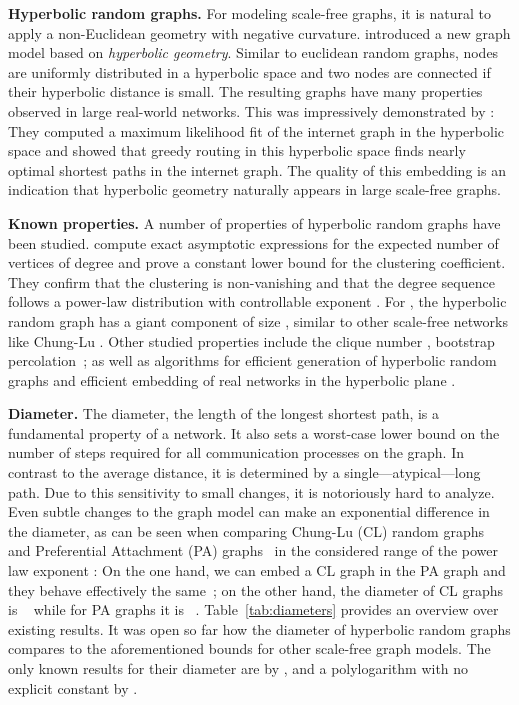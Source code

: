 \documentclass{llncs}
\newcommand{\tabref}[1]{Table~\ref{tab:#1}}
\begin{document}
\textbf{Hyperbolic random graphs.}
For modeling scale-free graphs, it is natural to apply a non-Euclidean geometry with negative curvature.
\citet{krioukov2010hyperbolic} introduced a new graph model based on \emph{hyperbolic geometry}. Similar to euclidean random graphs,
nodes are uniformly distributed in a hyperbolic space and two nodes are connected
if their hyperbolic distance is small. 
The resulting graphs have many properties observed in large real-world networks.
This was impressively demonstrated by \citet{boguna2010sustaining}:
They computed a maximum likelihood fit of the internet graph in the hyperbolic space
and showed that greedy routing in this hyperbolic space finds nearly optimal shortest paths in the internet graph.
The quality of this embedding is an indication that hyperbolic geometry naturally appears in large scale-free graphs.

\textbf{Known properties.}
A number of properties of hyperbolic random graphs have been studied.
\citet{gugelmann2012random} compute exact asymptotic expressions for the expected number of vertices of degree  and prove a constant lower bound for the clustering coefficient.
They confirm that the clustering is non-vanishing and that the degree sequence follows a power-law distribution with controllable exponent . For , the hyperbolic random graph has a giant component of size  \cite{Bode:2013aa,bfmconnected}, similar to other scale-free networks like Chung-Lu \cite{chung2002average}. Other studied properties include the clique number \cite{friedrich2015cliques}, bootstrap percolation~\cite{candellero2014bootstrap}; as well as algorithms for efficient generation of hyperbolic random graphs \cite{von2015fast} and efficient embedding of real networks in the hyperbolic plane \cite{6705650}.

\textbf{Diameter.}
The diameter, the length of the longest shortest path, is a fundamental property of a network.
It also sets a worst-case lower bound on the number of steps required for all communication processes
on the graph. In contrast to the average distance, it is determined by a single---atypical---long path.
Due to this sensitivity to small changes, it is notoriously hard to analyze.
Even subtle changes to the graph model can make an exponential difference in the diameter, as can be seen when comparing
Chung-Lu (CL) random graphs~\cite{chung2002average} and
Preferential Attachment (PA) graphs~\cite{barabasi1999emergence} 
in the considered range of the  power law exponent :
On the one hand, we can embed a CL graph in the PA graph and they behave effectively
the same~\cite{UltraFastRumor:unpub};
on the other hand,
the diameter of 
CL graphs is ~\cite{chung2002average}
while for PA graphs it is
~\cite{diamPA}.
\tabref{diameters} provides an overview over existing results.
It was open so far how the diameter of hyperbolic random graphs compares to the aforementioned
bounds for other scale-free graph models.
The only known results for their diameter are
 by \citet{KiwiMitsche15}, and a polylogarithm with no explicit constant by \citet{bringmann2015geometric}.
\end{document}
